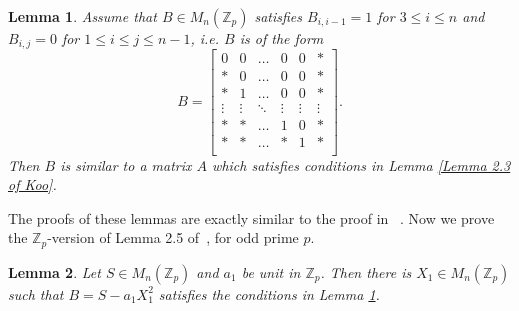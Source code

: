 \documentclass[12pt,a4paper]{article}
\newtheorem{lem}{Lemma}[section]
\begin{document}
	\begin{lem} \label{Lemma 2.4 of Koo}
		Assume that $B \in M_n({\mathbb{Z}_p})$ satisfies $B_{i,i-1} =1$ for $3 \leq i \leq n$ and $B_{i,j} = 0$ for $1 \leq i \leq j \leq n-1$, i.e. $B$ is of the form $$B= \begin{bmatrix}
		0 & 0 & \ldots & 0 & 0 & *\\
		* & 0 & \ldots & 0 & 0 & *\\
		* & 1 & \ldots & 0 & 0 & *\\
		\vdots& \vdots & \ddots & \vdots & \vdots &\vdots \\
		* & * & \ldots & 1 & 0 & *\\
		* & * & \ldots & * & 1 & *\\
		\end{bmatrix}.$$ Then $B$ is similar to a matrix $A$ which satisfies conditions in Lemma \ref{Lemma 2.3 of Koo}.
	\end{lem}
	The proofs of these lemmas are exactly similar to the proof in ~\cite{Koo2025}. Now we prove the $\mathbb{Z}_p$-version of Lemma 2.5 of~\cite{Koo2025}, for odd prime $p$.
	\begin{lem} \label{Lemma 2.5 of Koo}
		Let $S \in M_n(\mathbb{Z}_p)$ and $a_1$ be unit in $\mathbb{Z}_p$. Then there is $X_1 \in M_n(\mathbb{Z}_p)$ such that $B=S-a_1X_1^2$ satisfies the conditions in Lemma \ref{Lemma 2.4 of Koo}. 
	\end{lem}
\end{document}
